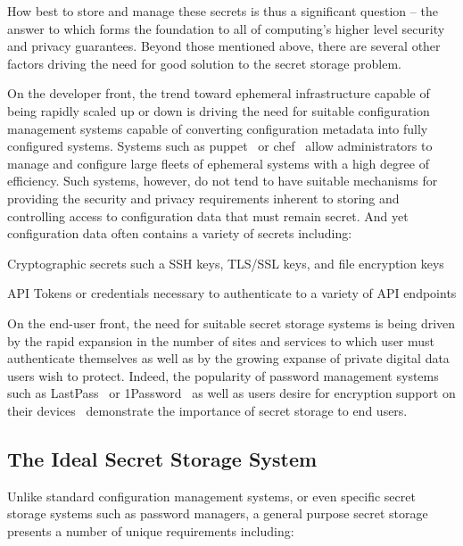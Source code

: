 How best to store and manage these secrets is thus a significant
question -- the answer to which forms the foundation to all of
computing's higher level security and privacy guarantees. Beyond those
mentioned above, there are several other factors driving the need for
good solution to the secret storage problem.

On the developer front, the trend toward ephemeral infrastructure
capable of being rapidly scaled up or down is driving the need for
suitable configuration management systems capable of converting
configuration metadata into fully configured systems. Systems such as
puppet~\cite{puppet} or chef~\cite{chef} allow administrators to
manage and configure large fleets of ephemeral systems with a high
degree of efficiency. Such systems, however, do not tend to have
suitable mechanisms for providing the security and privacy
requirements inherent to storing and controlling access to
configuration data that must remain secret. And yet configuration data
often contains a variety of secrets including:

\begin{packed_item}
\item Cryptographic secrets such a SSH keys, TLS/SSL keys, and file
  encryption keys
\item API Tokens or credentials necessary to authenticate to a variety of
  API endpoints
\end{packed_item}

On the end-user front, the need for suitable secret storage systems is
being driven by the rapid expansion in the number of sites and
services to which user must authenticate themselves as well as by the
growing expanse of private digital data users wish to protect. Indeed,
the popularity of password management systems such as
LastPass~\cite{lastpass} or 1Password~\cite{onepassword} as well as
users desire for encryption support on their
devices~\cite{intercept-cookencryption} demonstrate the importance of
secret storage to end users.

\subsection{The Ideal Secret Storage System}


Unlike standard configuration management systems, or even specific
secret storage systems such as password managers, a general purpose
secret storage presents a number of unique requirements including:

